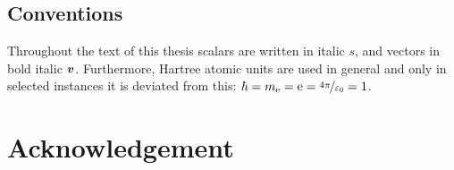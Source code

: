 \documentclass[ 10pt,
                DIV=10,
                headtopline=0.08em,
                headsepline=0.04em,
                headinclude,
                BCOR=6mm
              ]{scrbook}
\begin{document}
    
	\frontmatter



    
    {\hypersetup{hidelinks}\tableofcontents}%

    \clearpage
    \printglossaries

    

    \section*{Conventions}
    Throughout the text of this thesis scalars are written in italic $s$, and vectors in bold italic $\vb*{v}$.
    Furthermore, Hartree atomic units are used in general and only in selected instances it is deviated from this: $\hbar = m_\mathrm{e} = \mathrm e = \nicefrac{4\pi}{\varepsilon_0} = 1$. 
    \nonfrenchspacing

    \mainmatter
    \renewcommand{\thechapter}{\Roman{chapter}}
    

    

    

    

    

    

    

    \cleardoublepage
    \printbibliography

    \backmatter

    \chapter*{Acknowledgement}
    
    
\end{document}
